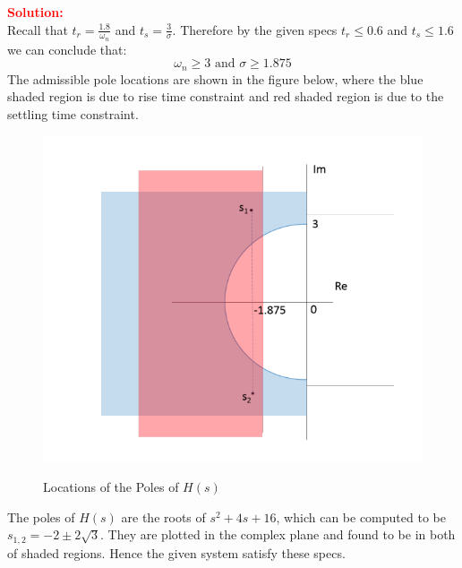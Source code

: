 \documentclass[12pt]{article}
\begin{document}
\noindent \textbf{\textcolor{red}{Solution:}} \\
Recall that $t_r=\frac{1.8}{\omega_n}$ and $t_s=\frac{3}{\sigma}$.
Therefore by the given specs $t_r \leq 0.6$ and $t_s \leq 1.6$  we can conclude that:
\[
\omega_n \geq 3 \text{  and  } \sigma \geq 1.875
\]
The admissible pole locations are shown in the figure below, where the blue shaded region is due to rise time constraint and red shaded region is due to the settling time constraint.

\begin{figure}[h!]
    \centering
    \includegraphics[width=0.65\linewidth]{figs/1.25.png}
    \label{fig:prb42}
    \caption{Locations of the Poles of \(H(s)\)}
\end{figure}
\noindent The poles of $H(s)$ are the roots of $s^2 + 4s + 16$, which can be computed to be $s_{1,2} = -2 \pm 2 \sqrt{3}$. They are plotted in the complex plane and found to be in both of shaded regions. Hence the given system satisfy these specs.
\clearpage
\end{document}
